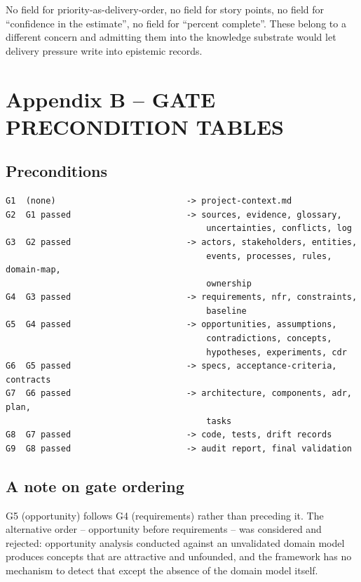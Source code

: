 \documentclass[11pt,a4paper]{article}
\begin{document}
No field for priority-as-delivery-order, no field for story points, no field for ``confidence in the estimate'', no field for ``percent complete''. These belong to a different concern and admitting them into the knowledge substrate would let delivery pressure write into epistemic records.

\section{Appendix B -- GATE PRECONDITION TABLES}

\subsection{Preconditions}

\begin{Verbatim}[fontsize=\footnotesize,breaklines=true,breakanywhere=true,breakautoindent=false,samepage=false]
G1  (none)                          -> project-context.md
G2  G1 passed                       -> sources, evidence, glossary,
                                        uncertainties, conflicts, log
G3  G2 passed                       -> actors, stakeholders, entities,
                                        events, processes, rules, domain-map,
                                        ownership
G4  G3 passed                       -> requirements, nfr, constraints,
                                        baseline
G5  G4 passed                       -> opportunities, assumptions,
                                        contradictions, concepts,
                                        hypotheses, experiments, cdr
G6  G5 passed                       -> specs, acceptance-criteria, contracts
G7  G6 passed                       -> architecture, components, adr, plan,
                                        tasks
G8  G7 passed                       -> code, tests, drift records
G9  G8 passed                       -> audit report, final validation
\end{Verbatim}

\subsection{A note on gate ordering}

G5 (opportunity) follows G4 (requirements) rather than preceding it. The alternative order -- opportunity before requirements -- was considered and rejected: opportunity analysis conducted against an unvalidated domain model produces concepts that are attractive and unfounded, and the framework has no mechanism to detect that except the absence of the domain model itself.
\end{document}
